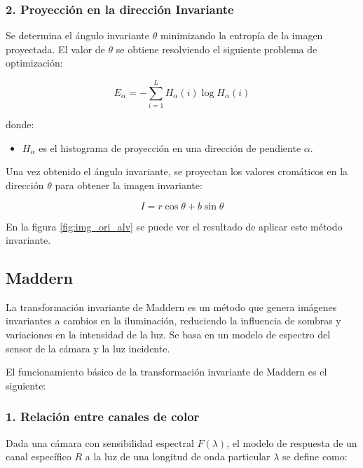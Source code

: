 \subsubsection{2. Proyección en la dirección Invariante}

Se determina el ángulo invariante $\theta$ minimizando la entropía de la imagen proyectada. El valor de $\theta$ se obtiene resolviendo el siguiente problema de optimización:

$$E_{\alpha } =-\sum_{i=1}^L H_{\alpha } (i)\log H_{\alpha } (i)$$

donde:

\begin{itemize}
\setlength{\itemsep}{-1ex}
   \item{\begin{flushleft} $H_{\alpha }$ es el histograma de proyección en una dirección de pendiente $\alpha$. \end{flushleft}}
\end{itemize}

Una vez obtenido el ángulo invariante, se proyectan los valores cromáticos en la dirección $\theta$ para obtener la imagen invariante:

$$I=r\cos \theta +b\sin \theta$$

En la figura \ref{fig:img_ori_alv} se puede ver el resultado de aplicar este método invariante.


\subsection{Maddern}\label{maddern}

La transformación invariante de Maddern \cite{maddern2014} es un método que genera imágenes invariantes a cambios en la iluminación, reduciendo la influencia de sombras y variaciones en la intensidad de la luz. Se basa en un modelo de espectro del sensor de la cámara y la luz incidente.

El funcionamiento básico de la transformación invariante de Maddern es el siguiente:

\subsubsection{1. Relación entre canales de color}

Dada una cámara con sensibilidad espectral $F(\lambda )$, el modelo de respuesta de un canal específico $R$ a la luz de una longitud de onda particular $\lambda$ se define como:

